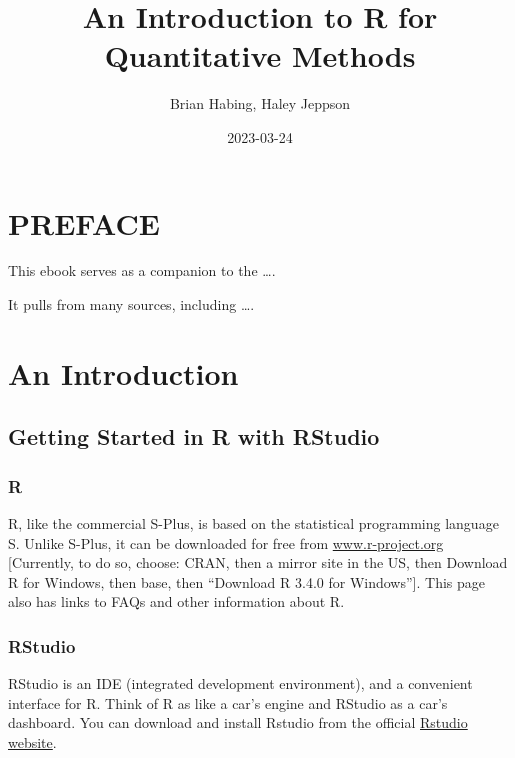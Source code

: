\documentclass[
]{book}
\title{An Introduction to R for Quantitative Methods}
\author{Brian Habing, Haley Jeppson}
\date{2023-03-24}
\begin{document}
\maketitle

{
\setcounter{tocdepth}{1}
\tableofcontents
}
\hypertarget{preface}{%
\chapter*{PREFACE}\label{preface}}

This ebook serves as a companion to the \ldots.

It pulls from many sources, including \ldots.

\hypertarget{an-introduction}{%
\chapter{An Introduction}\label{an-introduction}}

\hypertarget{getting-started-in-r-with-rstudio}{%
\section*{Getting Started in R with RStudio}\label{getting-started-in-r-with-rstudio}}

\hypertarget{r}{%
\subsection*{R}\label{r}}

R, like the commercial S-Plus, is based on the statistical programming language S. Unlike S-Plus, it can be downloaded for free from \url{www.r-project.org} {[}Currently, to do so, choose: CRAN, then a mirror site in the US, then Download R for Windows, then base, then ``Download R 3.4.0 for Windows''{]}. This page also has links to FAQs and other information about R.

\hypertarget{rstudio}{%
\subsection*{RStudio}\label{rstudio}}

RStudio is an IDE (integrated development environment), and a convenient interface for R. Think of R as like a car's engine and RStudio as a car's dashboard. You can download and install Rstudio from the official \href{https://rstudio.com/products/rstudio/download/}{Rstudio website}.
\end{document}
